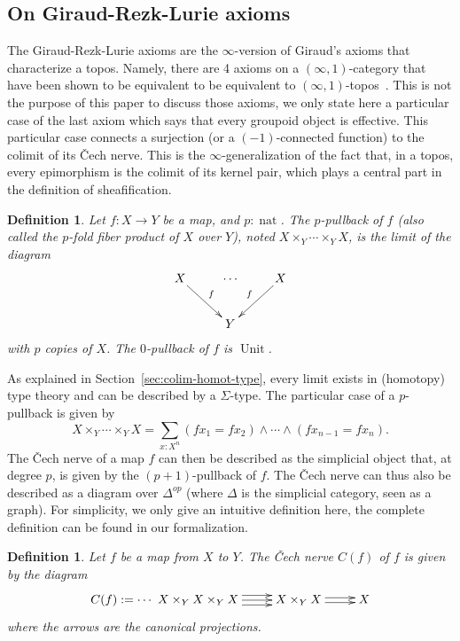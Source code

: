 \documentclass[conference]{IEEEtran}
\makeatletter
\newtheorem{defi}[thm]{Definition}
\def\dar[#1]#2{\ar@<-#2>[#1]\ar@<#2>[#1]} %
\def\tar[#1]#2{\ar@<#2>[#1]\ar@<0pt>[#1]\ar@<-#2>[#1]} %
\DeclareMathOperator{\nat}{nat}
\DeclareMathOperator{\Unit}{Unit}
\makeatother
\begin{document}
\subsection{On Giraud-Rezk-Lurie axioms}
\label{sec:giraud-ax}

The Giraud-Rezk-Lurie axioms are the $\infty$-version of Giraud's
axioms that characterize a topos. Namely, there are 4 axioms on a
$(\infty,1)$-category that have been shown to be equivalent to be
equivalent to $(\infty,1)$-topos~\cite[Chapter 6]{lurie}. This is not
the purpose of this paper to discuss those axioms, we only state here
a particular case of the last axiom which says that every groupoid
object is effective. 
%
This particular case connects a surjection (or a $(-1)$-connected
function) to the colimit of its \v{C}ech nerve.
%
This is the $\infty$-generalization of the fact that, in a topos,
every epimorphism is the colimit of its kernel pair, which plays a
central part in the definition of sheafification.

\begin{defi}
  Let $f:X \to Y$ be a map, and $p:\nat$. The $p$-pullback of $f$
  (also called the $p$-fold fiber product of $X$ over $Y$),
  noted $X\times_Y \cdots\times_Y X$, is
  the limit of the diagram
  $$\xymatrix{
    X \ar[rd]^f & \cdots & X \ar[ld]_f \\
      &    Y   &
  }$$
  with $p$ copies of $X$. The $0$-pullback of $f$ is $\Unit$.
\end{defi}

As explained in Section~\ref{sec:colim-homot-type}, every limit exists
in (homotopy) type theory and can be described by a $\Sigma$-type. 
%
The particular case of a $p$-pullback is given by
%
$$
X\times_Y \cdots\times_Y X = \sum_{x:X^n} (f x_1 = f x_2) \land
\cdots \land (f x_{n-1} = f x_n).
$$
%
The \v{C}ech nerve of a map $f$ can then be described as the
simplicial object that, at degree $p$, is given by the
$(p+1)$-pullback of $f$. The \v{C}ech nerve can thus also be described
as a diagram over $\Delta^{op}$ (where $\Delta$ is the simplicial
category, seen as a graph). For simplicity, we only give an intuitive
definition here, the complete definition can be found in our
formalization.
%
\begin{defi}
  Let $f$ be a map from $X$ to $Y$. The {\em \v{C}ech nerve} $C(f)$ of $f$
  is given by the diagram
  $$\xymatrix{
    C(f) := \cdots~ X \times_Y X \times_Y X \tar[r]{4pt} & X \times_Y X \dar[r]{2pt} & X
  }$$
where the arrows are the canonical projections.
\end{defi}
\end{document}
